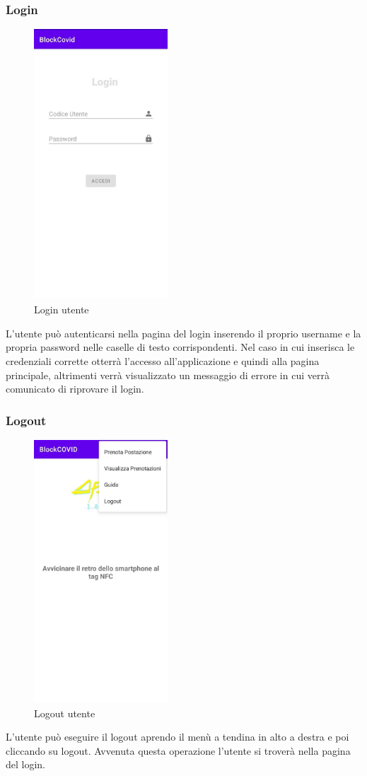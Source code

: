 \subsubsection{Login}
\begin{figure}[H]
	\centering
	\includegraphics[width=5cm]{res/images/login.png}
	\caption{Login utente}
\end{figure}
L'utente può autenticarsi nella pagina del login inserendo il proprio username e la propria password nelle caselle di testo corrispondenti.
Nel caso in cui inserisca le credenziali corrette otterrà l'accesso all'applicazione e quindi alla pagina principale, altrimenti verrà visualizzato un messaggio di errore in cui verrà comunicato di riprovare il login.

\subsubsection{Logout}
\begin{figure}[H]
	\centering
	\includegraphics[width=5cm]{res/images/menuATendina.png}
	\caption{Logout utente}
\end{figure}
L'utente può eseguire il logout aprendo il menù a tendina in alto a destra e poi cliccando su logout. Avvenuta questa operazione l'utente si troverà nella pagina del login.

